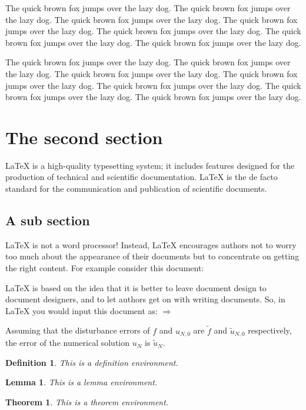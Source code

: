 \documentclass[openany,twoside,12pt]{book}
\theoremstyle{plain}
\newtheorem{definition}{Definition}[chapter]
\newtheorem{lemma}{Lemma}[chapter]
\newtheorem{theorem}{Theorem}[chapter]
\numberwithin{equation}{chapter}
\numberwithin{figure}{chapter}
\numberwithin{table}{chapter}
\begin{document}
The quick brown fox jumps over the lazy dog. The quick brown fox jumps over the lazy dog. The quick brown fox jumps over the lazy dog. The quick brown fox jumps over the lazy dog. The quick brown fox jumps over the lazy dog. The quick brown fox jumps over the lazy dog. The quick brown fox jumps over the lazy dog.

The quick brown fox jumps over the lazy dog. The quick brown fox jumps over the lazy dog. The quick brown fox jumps over the lazy dog. The quick brown fox jumps over the lazy dog. The quick brown fox jumps over the lazy dog. The quick brown fox jumps over the lazy dog. The quick brown fox jumps over the lazy dog.


\section{The second section}
LaTeX is a high-quality typesetting system; it includes features designed for the production of technical and scientific documentation. LaTeX is the de facto standard for the communication and publication of scientific documents.

\subsection{A sub section}
LaTeX is not a word processor! Instead, LaTeX encourages authors not to worry too much about the appearance of their documents but to concentrate on getting the right content. For example consider this document:

LaTeX is based on the idea that it is better to leave document design to document designers, and to let authors get on with writing documents. So, in LaTeX you would input this document as:
$ \Rightarrow $

Assuming that the disturbance errors of $f$ and $u_{N,0}$ are $\tilde{f}$ and $\tilde{u}_{N,0}$ respectively, the error of the numerical solution $u_N$ is $\tilde{u}_N$.


\begin{definition}
This is a definition environment.
\end{definition}

\begin{lemma}
This is a lemma environment.
\end{lemma}

\begin{theorem}
This is a theorem environment.
\end{theorem}
\end{document}
